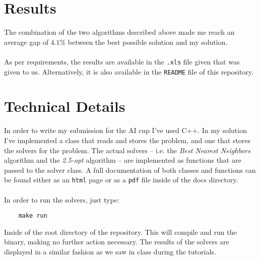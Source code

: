 \documentclass[unicode,11pt,a4paper,oneside,numbers=endperiod,openany]{scrartcl}
\begin{document}
\section{Results}
The combination of the two algorithms described above made me reach an average gap of $4.1\%$ between the best possible solution and my solution. \\ \\
As per requirements, the results are available in the \verb|.xls| file given that was given to us. Alternatively, it is also available in the \verb|README| file of this repository.

\section{Technical Details}
In order to write my submission for the AI cup I've used C++. In my solution I've implemented a class that reads and stores the problem, and one that stores the solvers for the problem. The actual solvers -- i.e. the \textit{Best Nearest Neighbors} algorithm and the \textit{2.5-opt} algorithm -- are implemented as functions that are passed to the solver class. A full documentation of both classes and functions can be found either as an \verb|html| page or as a \verb|pdf| file inside of the docs directory. \\ \\
In order to run the solvers, just type:

\begin{verbatim}
    make run
\end{verbatim}
Inside of the root directory of the repository. This will compile and run the binary, making no further action necessary. The results of the solvers are displayed in a similar fashion as we saw in class during the tutorials.
\end{document}
